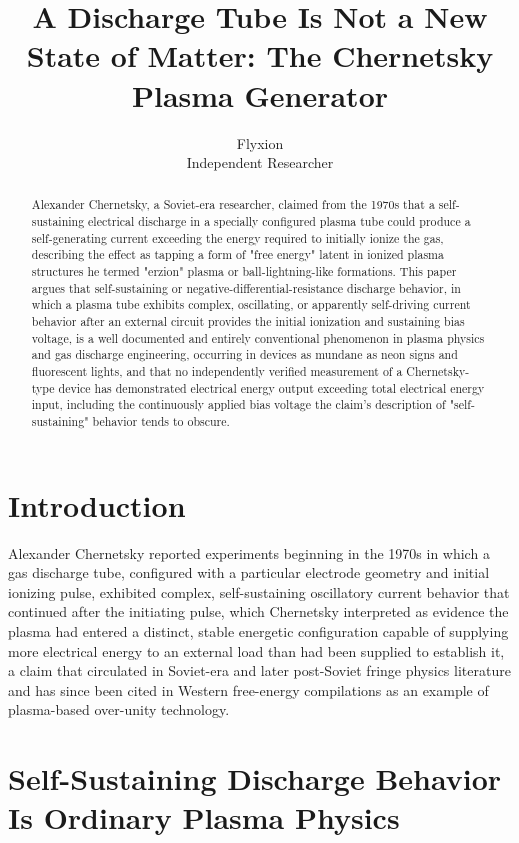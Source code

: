 \documentclass[11pt]{article}
\title{A Discharge Tube Is Not a New State of Matter: The Chernetsky Plasma Generator}
\author{Flyxion \\ \small Independent Researcher}
\date{}
\begin{document}
\maketitle

\begin{abstract}
Alexander Chernetsky, a Soviet-era researcher, claimed from the 1970s that a self-sustaining electrical discharge in a specially configured plasma tube could produce a self-generating current exceeding the energy required to initially ionize the gas, describing the effect as tapping a form of "free energy" latent in ionized plasma structures he termed "erzion" plasma or ball-lightning-like formations. This paper argues that self-sustaining or negative-differential-resistance discharge behavior, in which a plasma tube exhibits complex, oscillating, or apparently self-driving current behavior after an external circuit provides the initial ionization and sustaining bias voltage, is a well documented and entirely conventional phenomenon in plasma physics and gas discharge engineering, occurring in devices as mundane as neon signs and fluorescent lights, and that no independently verified measurement of a Chernetsky-type device has demonstrated electrical energy output exceeding total electrical energy input, including the continuously applied bias voltage the claim's description of "self-sustaining" behavior tends to obscure.
\end{abstract}

\section{Introduction}

Alexander Chernetsky reported experiments beginning in the 1970s in which a gas discharge tube, configured with a particular electrode geometry and initial ionizing pulse, exhibited complex, self-sustaining oscillatory current behavior that continued after the initiating pulse, which Chernetsky interpreted as evidence the plasma had entered a distinct, stable energetic configuration capable of supplying more electrical energy to an external load than had been supplied to establish it, a claim that circulated in Soviet-era and later post-Soviet fringe physics literature and has since been cited in Western free-energy compilations as an example of plasma-based over-unity technology.

\section{Self-Sustaining Discharge Behavior Is Ordinary Plasma Physics}
\end{document}
